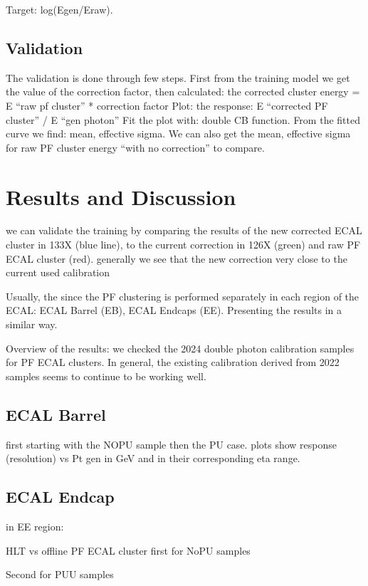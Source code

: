 Target: log(Egen/Eraw). 

 
\subsection{Validation}

The validation is done through few steps. First from the training model we get the value of the correction factor, then calculated:  the corrected cluster energy = E “raw pf cluster” * correction factor Plot: the response: E “corrected PF cluster” / E “gen photon” Fit the plot with: double CB function. From the fitted curve we find: mean, effective sigma. We can also get the mean, effective sigma for raw PF cluster energy “with no correction” to compare. 

\section{Results and Discussion}

we can validate the training by comparing the results of the new corrected ECAL cluster in 133X (blue line), to the current  correction in 126X (green) and  raw PF ECAL cluster (red).
generally we see that the new  correction very close to the current used calibration

Usually, the since the PF clustering is performed separately in each region of the ECAL: ECAL Barrel (EB), ECAL Endcaps (EE).
Presenting the results in a similar way.

Overview of the results: we checked the 2024 double photon calibration samples for PF ECAL clusters. In general, the existing calibration derived from 2022 samples seems to continue to be working well. 

 
\subsection{ECAL Barrel}
first starting with the NOPU sample then the PU case.
plots show response (resolution) vs Pt gen in GeV and in their corresponding eta range.





\subsection{ECAL Endcap}
in EE region:







HLT vs offline PF ECAL cluster
first for NoPU samples

Second for PUU samples

